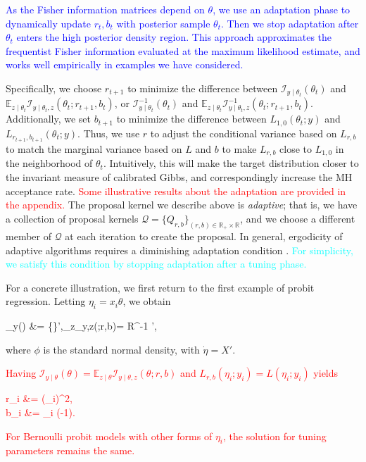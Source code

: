 \documentclass[11pt]{article}
\newcommand{\leojames}[1]{\textcolor{blue}{#1}}
\newcommand{\leo}[1]{{\textcolor{red}{#1}}}
\newcommand{\dave}[1]{{\textcolor{cyan}{#1}}}
\newcommand{\be}{\begin{equs}}
\newcommand{\ee}{\end{equs}}
\newcommand{\bb}[1]{\mathbb{#1}}
\newcommand{\mc}[1]{\mathcal{#1}}
\newcommand{\diag}{\text{diag}}
\begin{document}
\leojames{As the Fisher information matrices depend on $\theta$, we use  an adaptation phase to dynamically update $r_t,b_t$ with posterior sample $\theta_t$. Then
we stop adaptation after $\theta_t$ enters the high posterior
density region. This approach approximates the frequentist Fisher information evaluated at the maximum likelihood estimate,
and works well empirically in examples we have considered.}

 Specifically, we choose $r_{t+1}$ to minimize the  difference between $\mc  I_{y\mid \theta_{t}}(\theta_{t})$
and $\bb E_{z\mid \theta_{t}}\mc I_{y\mid \theta_{t},z}(\theta_{t};r_{t+1},b_{t})$, or $\mc  I^{-1}_{y\mid \theta_{t}}(\theta_{t})$
and $\bb E_{z\mid \theta_{t}}\mc I^{-1}_{y\mid \theta_{t},z}(\theta_{t};r_{t+1},b_{t})$.
Additionally, we set $b_{t+1}$ to minimize the difference between $L_{1,0}(\theta_t;y)$ and $L_{r_{t+1},b_{t+1}}(\theta_t;y)$. Thus, we use $r$ to adjust the conditional variance based on $L_{r,b}$ to match the marginal variance based on $L$ and $b$ to make $L_{r,b}$ close to $L_{1,0}$ in the neighborhood of $\theta_t$. Intuitively, this will make the target distribution closer to the invariant measure of calibrated Gibbs, and correspondingly increase the MH acceptance rate. \leo{Some illustrative results about the adaptation
are provided in the appendix.} The proposal kernel we describe above is \emph{adaptive}; that is, we have a collection of proposal kernels $\mc Q = \{Q_{r,b}\}_{(r,b) \in \bb R_+ \times \bb R}$, and we choose a different member of $\mc Q$ at each iteration to create the proposal. 
In general, ergodicity of adaptive algorithms requires a diminishing adaptation condition \citep{roberts2007coupling}.  \dave{For simplicity, we satisfy this condition by stopping adaptation after a tuning phase.}

For a concrete illustration, we first return to the first example of probit regression. Letting $\eta_i = x_i\theta$, we obtain
\be
\mc I_{y\mid \theta}({\theta}) &=  \dot\eta\diag\bigg\{\bigg\}\dot\eta',\qquad \bb E_{z\mid \theta}\mc I_{y\mid \theta,z}({\theta};r,b)= \dot\eta R^{-1} \dot\eta',
\ee
 where $\phi$ is the standard normal density, with $\dot\eta=X'$. \leo{Having $\mc I_{y\mid \theta}({\theta})= \bb
 E_{z\mid \theta}\mc I_{y\mid \theta,z}({\theta};r,b)$  and $L_{r,b}(\eta_i;y_i)= L(\eta_i;y_i)
$  yields 
\be
r_i &= \frac{\Phi(\eta_i)(1- \Phi(\eta_i))} {\phi(\eta_i)^2},\\
b_i &= \eta_i (\sqrt{r_i}-1).
\ee
 For Bernoulli probit models with other forms of $\eta_i$, the solution for tuning parameters remains the same.}
\end{document}
